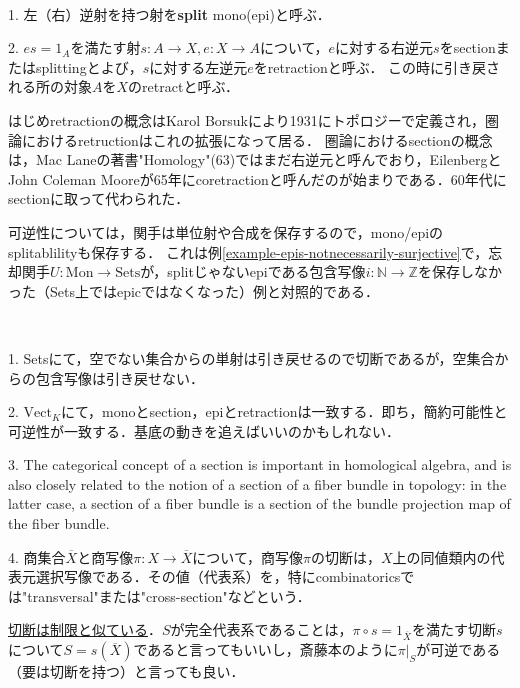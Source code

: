 \documentclass[uplatex, 12pt, dvipdfmx]{jsarticle}
\begin{document}
\begin{definition}　

    1. 左（右）逆射を持つ射を\textbf{split} mono(epi)と呼ぶ．

    2. $es=1_A$を満たす射$s:A\to X, e:X\to A$について，$e$に対する右逆元$s$をsectionまたはsplittingとよび，$s$に対する左逆元$e$をretractionと呼ぶ．
    この時に引き戻される所の対象$A$を$X$のretractと呼ぶ．
    \begin{center}
    \end{center}
\end{definition}
\begin{remark*}
    はじめretractionの概念はKarol Borsukにより1931にトポロジーで定義され，圏論におけるretructionはこれの拡張になって居る．
    圏論におけるsectionの概念は，Mac Laneの著書"Homology"(63)ではまだ右逆元と呼んでおり，EilenbergとJohn Coleman Mooreが65年にcoretractionと呼んだのが始まりである．60年代にsectionに取って代わられた．

    可逆性については，関手は単位射や合成を保存するので，mono/epiのsplitablilityも保存する．
    これは例\ref{example-epis-notnecessarily-surjective}で，忘却関手$U:\mathrm{Mon}\to\mathrm{Sets}$が，splitじゃないepiである包含写像$i:\mathbb{N}\to\mathbb{Z}$を保存しなかった（Sets上ではepicではなくなった）例と対照的である．
\end{remark*}
\begin{example*}　
    
    1. Setsにて，空でない集合からの単射は引き戻せるので切断であるが，空集合からの包含写像は引き戻せない．

    2. $\mathrm{Vect}_K$にて，monoとsection，epiとretractionは一致する．即ち，簡約可能性と可逆性が一致する．基底の動きを追えばいいのかもしれない．

    3. The categorical concept of a section is important in homological algebra, and is also closely related to the notion of a section of a fiber bundle in topology: in the latter case, a section of a fiber bundle is a section of the bundle projection map of the fiber bundle.

    4. 商集合$\overline{X}$と商写像$\pi :X\to\overline{X}$について，商写像$\pi$の切断は，$X$上の同値類内の代表元選択写像である．その値（代表系）を，特にcombinatoricsでは"transversal"または"cross-section"などという．

    \underline{切断は制限と似ている}．$S$が完全代表系であることは，$\pi\circ s=1_{\overline{X}}$を満たす切断$s$について$S=s(\overline{X})$であると言ってもいいし，斎藤本のように$\pi |_S$が可逆である（要は切断を持つ）と言っても良い．
\end{example*}
\end{document}
